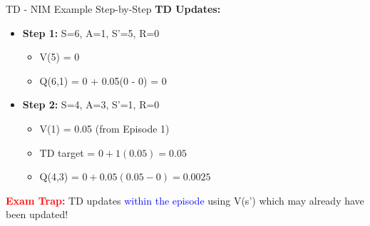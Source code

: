 \documentclass[8pt]{beamer}
\begin{document}
\begin{frame}{TD - NIM Example Step-by-Step}
		\textbf{TD Updates:}
		\begin{itemize}
			\item \textbf{Step 1:} S=6, A=1, S'=5, R=0
			\begin{itemize}
				\item V(5) = 0
				\item Q(6,1) = 0 + 0.05(0 - 0) = 0
			\end{itemize}
			\item \textbf{Step 2:} S=4, A=3, S'=1, R=0
			\begin{itemize}
				\item V(1) = 0.05 (from Episode 1)
				\item TD target = $0 + 1(0.05) = 0.05$
				\item Q(4,3) = $0 + 0.05(0.05 - 0) = 0.0025$
			\end{itemize}
		\end{itemize}
		
		\textcolor{red}{\textbf{Exam Trap:}} TD updates \textcolor{blue}{within the episode} using V(s') which may already have been updated!
	\end{frame}
	
\end{document}
